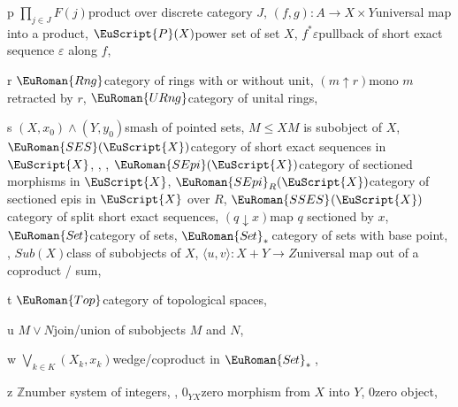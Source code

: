\documentclass [12pt,oneside]{book}%
\theoremstyle{captionstyle}  %
\newcommand{\IndSep}{\qquad}
\newcommand{\from}{\colon}				%
\newcommand{\SctndEpi}[2]{{(#1\downarrow #2)}}				%
\newcommand{\RtrctdMono}[2]{{(#1\uparrow #2)}}				%
\newcommand{\PwrSt}[1]{\EuScript{P}(#1)}			%
\newcommand{\ZNr}{\mathbb{Z}}		%
\newcommand{\Sets}{\EuRoman{S{\kern-0.12ex}e{\hskip-0.14ex}t}}			                       %
\newcommand{\SetsBsd}{\EuRoman{S{\kern-0.12ex}e{\hskip-0.14ex}t}_{\ast}\,}	%
\newcommand{\Tops}{\EuRoman{Top}}											%
\newcommand{\Rngs}{\EuRoman{ Rn{\kern-.1ex}g}}                        %
\newcommand{\URngs}{\EuRoman{ U{\kern-.1ex}Rn{\kern-.1ex}g}}          %
\newcommand{\ZeroObject}{0}                           %
\newcommand{\ZeroMap}{0}                                %
\newcommand{\Ctgry}[1]{\EuScript{#1}}					%
\newcommand{\SubObjcts}[1]{\mathit{Sub}(#1)}	%
\newcommand{\SEpisIn}[1]{\EuRoman{SEpi}(\Ctgry{#1})}								%
\newcommand{\SEpisInOver}[2]{\EuRoman{SEpi}_{#2}(\Ctgry{#1})}								%
\newcommand{\SESCat}[1]{\EuRoman{SES}(\Ctgry{#1})}				%
\newcommand{\SSESCat}[2][{}]{\EuRoman{SSES}_{#1}(\Ctgry{#2})}				%
\newcommand{\FamPrdct}[2]{\prod_{#1}#2}		%
\newcommand{\Prdct}[2]{#1 \times #2}	 	%
\newcommand{\PrdctMapInto}[1]{( #1)}			%
\newcommand{\SumMapOutOf}[1]{\langle #1\rangle}     %
\newcommand{\join}{\ensuremath{\vee}}
\begin{document}
\begin{theindex}
    \indexspace

    \item p
    \subitem $\FamPrdct {j\in J}{F(j)}$\IndSep product over discrete category $J$,
    \subitem $\PrdctMapInto {f,g}\from A\to \Prdct {X}{Y}$\IndSep universal map into a product,
    \subitem $\PwrSt {X}$\IndSep power set of set $X$, 
    \subitem $f^{\ast }\varepsilon $\IndSep pullback of short exact sequence $\varepsilon $ along $f$,

    \indexspace

    \item r
    \subitem $\Rngs $\IndSep category of rings with or without unit,
    \subitem $\RtrctdMono {m}{r}$\IndSep mono $m$ retracted by $r$,
    \subitem $\URngs $\IndSep category of unital rings, 

    \indexspace

    \item s
    \subitem $(X,x_0)\wedge (Y,y_0)$\IndSep smash of pointed sets,
    \subitem $M\leq X$\IndSep $M$ is subobject of $X$, 
    \subitem $\SESCat {X}$\IndSep category of short exact sequences in $\Ctgry {X}$,
    , , 
    \subitem $\SEpisIn {X}$\IndSep category of sectioned morphisms in $\Ctgry {X}$,
    \subitem $\SEpisInOver {X}{R}$\IndSep category of sectioned epis in $\Ctgry {X}$ over $R$,
    \subitem $\SSESCat {X}$\IndSep category of split short exact sequences,
    \subitem $\SctndEpi {q}{x}$\IndSep map $q$ sectioned by $x$,
    \subitem $\Sets $\IndSep category of sets, 
    \subitem $\SetsBsd $\IndSep category of sets with base point,
    , 
    \subitem $\SubObjcts {X}$\IndSep class of subobjects of $X$,
    \subitem $\SumMapOutOf {u,v}\from X+Y\to Z$\IndSep universal map out of a coproduct / sum,

    \indexspace

    \item t
    \subitem $\Tops $\IndSep category of topological spaces,

    \indexspace

    \item u
    \subitem $M\join N$\IndSep join/union of subobjects $M$ and $N$,

    \indexspace

    \item w
    \subitem $\bigvee _{k\in K} (X_k,x_k)$\IndSep wedge/coproduct in $\SetsBsd $,

    \indexspace

    \item z
    \subitem $\ZNr $\IndSep number system of integers, ,
    \subitem $\ZeroMap _{YX}$\IndSep zero morphism from $X$ into $Y$,
    \subitem $\ZeroObject $\IndSep zero object, 

\end{theindex}
\end{document}

